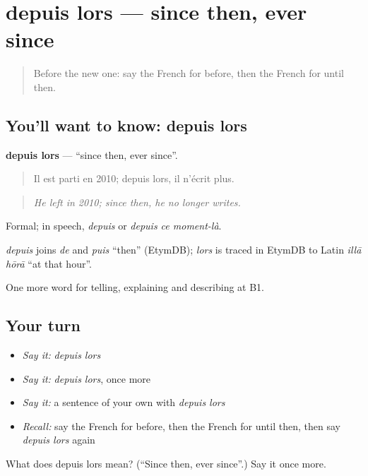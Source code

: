 \section[depuis lors]{depuis lors — since then, ever since}

\label{lesson:FR-C272-depuis-lors}



\begin{quote}
Before the new one: say the French for before, then the French for until then.
\end{quote}

\subsection*{You'll want to know: depuis lors}
\textbf{depuis lors} — \textquotedblleft{}since then, ever since\textquotedblright{}.

\begin{quote}
Il est parti en 2010; depuis lors, il n'écrit plus.
\end{quote}

\begin{quote}
\emph{He left in 2010; since then, he no longer writes.}
\end{quote}

Formal; in speech, \emph{depuis} or \emph{depuis ce moment-là}.

\begin{cousinweb}
\emph{depuis} joins \emph{de} and \emph{puis} \textquotedblleft{}then\textquotedblright{} (EtymDB); \emph{lors} is traced in EtymDB to Latin \emph{illā hōrā} \textquotedblleft{}at that hour\textquotedblright{}.
\end{cousinweb}

\begin{grammarlens}[title={What you've built}]
One more word for telling, explaining and describing at B1.
\end{grammarlens}

\subsection*{Your turn}
\begin{itemize}
\raggedright
  \item \emph{Say it:} \emph{depuis lors}
  \item \emph{Say it:} \emph{depuis lors}, once more
  \item \emph{Say it:} a sentence of your own with \emph{depuis lors}
  \item \emph{Recall:} say the French for before, then the French for until then, then say \emph{depuis lors} again
\end{itemize}

\begin{tcolorbox}[breakable,colback=teal!4,colframe=teal!35!black,title={Before you move on}]
What does depuis lors mean? (\textquotedblleft{}Since then, ever since\textquotedblright{}.) Say it once more.
\end{tcolorbox}
